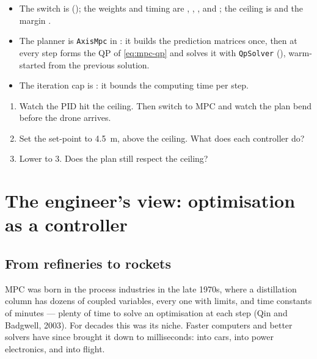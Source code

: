 \begin{inapp}
\begin{itemize}[leftmargin=1.2em]
  \item The switch is  (); the weights and timing are , , ,  and ; the ceiling is  and the margin .
  \item The planner is \texttt{AxisMpc} in : it builds the prediction matrices once, then at every step forms the QP of \cref{eq:mpc-qp} and solves it with \texttt{QpSolver} (), warm-started from the previous solution.
  \item The iteration cap is : it bounds the computing time per step.
\end{itemize}
\end{inapp}

\begin{trythis}
\begin{enumerate}
  \item Watch the PID hit the ceiling. Then switch to MPC and watch the plan bend before the drone arrives.
  \item Set the set-point to \SI{4.5}{m}, above the ceiling. What does each controller do?
  \item Lower  to 3. Does the plan still respect the ceiling?
\end{enumerate}
\end{trythis}

\section{The engineer's view: optimisation as a controller}

\subsection{From refineries to rockets}
MPC was born in the process industries in the late 1970s, where a distillation column has dozens of coupled variables, every one with limits, and time constants of minutes — plenty of time to solve an optimisation at each step (Qin and Badgwell, 2003). For decades this was its niche. Faster computers and better solvers have since brought it down to milliseconds: into cars, into power electronics, and into flight.


